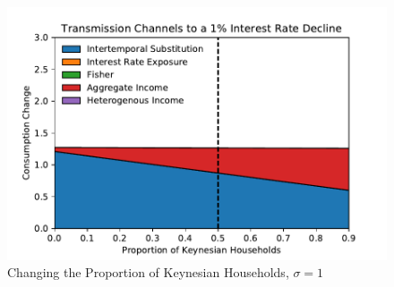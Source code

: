 \documentclass[titlepage]{\econtex}\newcommand{\texname}{ConsumptionHeterogeneity}
\begin{document}
\begin{figure} 
	\begin{centering}
		\includegraphics[scale=0.7]{../Python/DoloCode/Figures/ProportionKeynesian_sigma1_sw.pdf}
		\caption{Changing the Proportion of Keynesian Households, $\sigma=1$}
		\label{fig:ProportionKeynesian_sw}
	\end{centering}
\end{figure}
\end{document}
